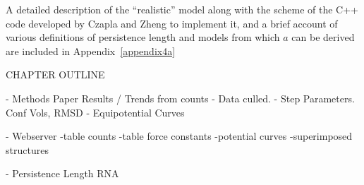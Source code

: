 A detailed description of the  ``realistic'' model along with the scheme
of the C++  code developed by Czapla and Zheng to  implement it, and a
brief account of various  definitions of persistence length and models
from which $a$ can be derived are included in Appendix~\ref{appendix4a}




CHAPTER OUTLINE

- Methods Paper Results / Trends from counts
  - Data culled.
- Step Parameters. Conf Vols, RMSD
- Equipotential Curves

- Webserver
  -table counts
  -table force constants
  -potential curves
  -superimposed structures

- Persistence Length RNA






